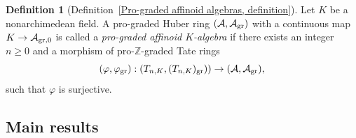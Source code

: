 \documentclass[12pt,twoside,a4paper]{article}
\theoremstyle{definition}
\newtheorem{mydef}[thm]{Definition}
\theoremstyle{remark}
\newcommand\gr{{\rm gr}}
\begin{document}
\begin{mydef}[Definition~\ref{Pro-graded affinoid algebras, definition}]Let $K$ be a nonarchimedean field. A pro-graded Huber ring $(\mathcal{A}, \mathcal{A}_{\gr})$ with a continuous map $K\to \mathcal{A}_{\gr,0}$ is called a \textit{pro-graded affinoid $K$-algebra} if there exists an integer $n\geq0$ and a morphism of pro-$\mathbb{Z}$-graded Tate rings \begin{equation*}(\varphi, \varphi_{\gr}): (T_{n, K}, (T_{n, K})_{\gr}))\to (\mathcal{A}, \mathcal{A}_{\gr}),\end{equation*}such that $\varphi$ is surjective.\end{mydef}

\subsection{Main results}
\end{document}
